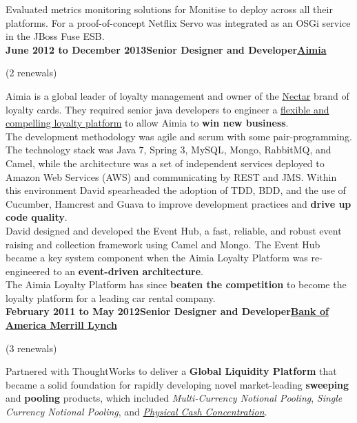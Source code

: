 \documentclass[a4paper,12pt]{article}
\newcommand{\clientwork}[3]{\textbf{#1\hfill#3\hfill#2}\nopagebreak}
\newcommand{\renewals}[2]{(#2)\nopagebreak}
\begin{document}
Evaluated metrics monitoring solutions for Monitise to deploy across all their platforms. For a proof-of-concept Netflix Servo was integrated as an OSGi service in the JBoss Fuse ESB.\\

\clientwork{June 2012 to December 2013}{\href{http://www.aimia.com/}{Aimia}}{Senior Designer and Developer}

\renewals{18 months}{2 renewals}

Aimia is a global leader of loyalty management and owner of the \href{http://www.nectar.com/}{Nectar} brand of loyalty cards. They required senior java developers to engineer a \href{https://www.aimia.com/our-businesses/insight-and-loyalty-solutions/aimia-loyalty/}{flexible and compelling loyalty platform} to allow Aimia to \textbf{win new business}.\\

The development methodology was agile and scrum with some pair-programming.  The technology stack was Java 7, Spring 3, MySQL, Mongo, RabbitMQ, and Camel, while the architecture was a set of independent services deployed to Amazon Web Services (AWS) and communicating by REST and JMS. Within this environment David spearheaded the adoption of TDD, BDD, and the use of Cucumber, Hamcrest and Guava to improve development practices and \textbf{drive up code quality}.\\

David designed and developed the Event Hub, a fast, reliable, and robust event raising and collection framework using Camel and Mongo. The Event Hub became a key system component when the Aimia Loyalty Platform was re-engineered to an \textbf{event-driven architecture}.\\


The Aimia Loyalty Platform has since \textbf{beaten the competition} to become the loyalty platform for a leading car rental company.\\

\clientwork{February 2011 to May 2012}{\href{http://corp.bankofamerica.com/}{Bank of America Merrill Lynch}}{Senior Designer and Developer}

\renewals{15 months}{3 renewals}


Partnered with ThoughtWorks to deliver a \textbf{Global Liquidity Platform} that became a solid foundation for rapidly developing novel market-leading \textbf{sweeping} and \textbf{pooling} products, which included \emph{Multi-Currency Notional Pooling}, \emph{Single Currency Notional Pooling}, and \emph{\href{http://www.marketwatch.com/story/bank-of-america-merrill-lynch-adds-physical-cash-concentration-to-global-liquidity-platform-2012-03-19}{Physical Cash Concentration}}.\\
\end{document}
